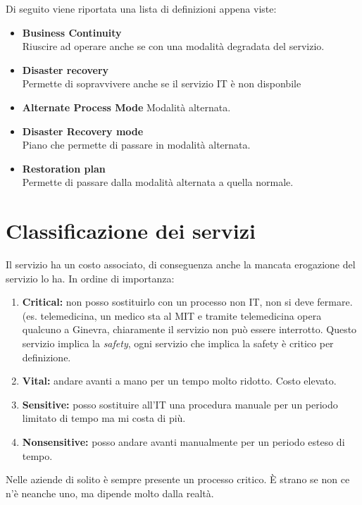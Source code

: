 Di seguito viene riportata una lista di definizioni appena viste:

\begin{itemize}
 \item \textbf{Business Continuity} \\
 Riuscire ad operare anche se con una modalità degradata del servizio.
 \item \textbf{Disaster recovery} \\
 Permette di sopravvivere anche se il servizio IT è non disponbile
 \item \textbf{Alternate Process Mode}
 Modalità alternata.
 \item \textbf{Disaster Recovery mode} \\
 Piano che permette di passare in modalità alternata.
 \item \textbf{Restoration plan} \\
 Permette di passare dalla modalità alternata a quella normale.
\end{itemize}

\section{Classificazione dei servizi}

Il servizio ha un costo associato, di conseguenza anche la mancata erogazione
del servizio lo ha. In ordine di importanza:
\begin{enumerate}
 \item \textbf{Critical:} non posso sostituirlo con un processo non IT, non si
deve fermare. (es. telemedicina, un medico sta al MIT e tramite telemedicina 
opera qualcuno a Ginevra, chiaramente il servizio non può essere interrotto. 
Questo servizio implica la \textit{safety}, ogni servizio che implica la safety 
è critico per definizione.
 \item \textbf{Vital:} andare avanti a mano per un tempo molto ridotto. Costo
elevato.
 \item \textbf{Sensitive:} posso sostituire all'IT una procedura manuale per un
periodo limitato di tempo ma mi costa di più.

 \item \textbf{Nonsensitive:} posso andare avanti manualmente per un periodo
esteso di tempo.

\end{enumerate}

Nelle aziende di solito è sempre presente un processo critico. È strano se non
ce n'è neanche uno, ma dipende molto dalla realtà.

